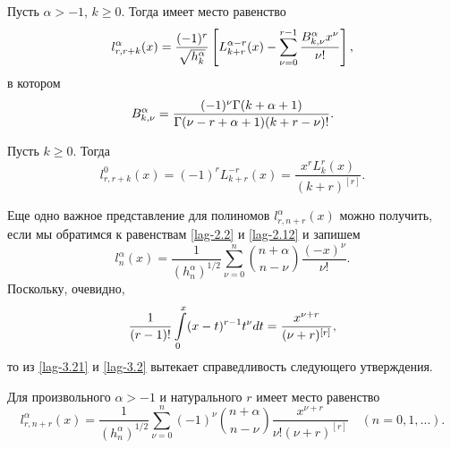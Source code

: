 \begin{theorem}
	Пусть $\alpha>-1$, $k\ge0$. Тогда имеет место равенство
	\begin{equation}\label{lag-3.19}
	l_{r,r+k}^{\alpha}(x)=\frac{(-1)^r}{\sqrt{h_k^\alpha}}\left[L_{k+r}^{\alpha-r}(x)-
	\sum_{\nu=0}^{r-1}
	{B_{k,\nu}^\alpha x^\nu\over\nu!}\right],
	\end{equation}
	в котором
	$$
	B_{k,\nu}^\alpha={(-1)^\nu\Gamma(k+\alpha+1)\over\Gamma(\nu-r+ \alpha+1)(k+r-\nu)!}.
	$$
\end{theorem}

\begin{corollary}\label{cor8}
	Пусть  $k\ge0$. Тогда
	$$
	l_{r,r+k}^{0}(x)=(-1)^rL_{k+r}^{-r}(x)=\frac{x^{r}L_{k}^{r}(x)}{(k+r)^{[r]}}.
	$$
\end{corollary}



Еще одно важное представление для полиномов $l_{r,n+r}^{\alpha}(x)$ можно получить, если мы обратимся к равенствам \eqref{lag-2.2} и \eqref{lag-2.12} и запишем
\begin{equation}\label{lag-3.21}
l_n^\alpha(x) =\frac{1}{(h_n^\alpha)^{1/2}}
\sum\limits_{\nu=0}^{n}
\binom{n+\alpha}{n-\nu}
\frac{(-x)^\nu}{\nu!}.
\end{equation}
Поскольку, очевидно,
\begin{equation*}
{1\over (r-1)!}\int\limits_{0}^x(x-t)^{r-1}t^\nu dt=\frac{x^{\nu+r}}{(\nu+r)^{[r]}},
\end{equation*}
то из \eqref{lag-3.21} и \eqref{lag-3.2} вытекает справедливость следующего утверждения.

\begin{statement}
	Для произвольного $\alpha>-1$ и натурального $r$ имеет место равенство
	\begin{equation*}\label{lag-3.22}
	l_{r,n+r}^{\alpha}(x)=
	\frac{1}{(h_n^\alpha)^{1/2}}
	\sum\limits_{\nu=0}^{n}(-1)^\nu \binom{n+\alpha}{n-\nu}
	\frac{x^{\nu+r}}{\nu!(\nu+r)^{[r]}}\quad (n=0,1,\ldots).
	\end{equation*}
\end{statement}













